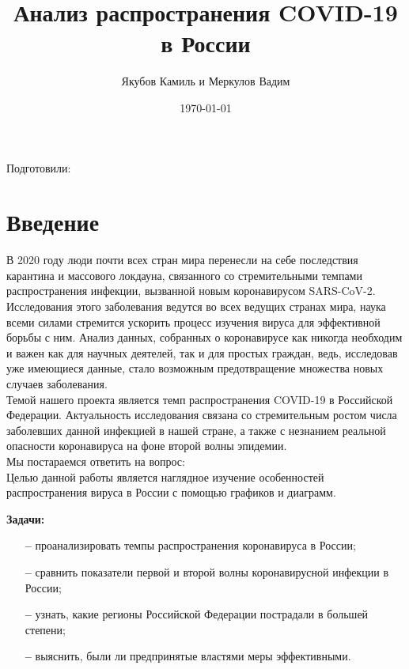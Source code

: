\documentclass[a4paper, 12pt]{extarticle}
\title{Анализ распространения COVID-19 в России}
\author{Якубов Камиль и Меркулов Вадим}
\date{\today}
\begin{document}
\begin{titlepage}
    \vspace*{5cm}
    \begin{center}

        \huge{\textbf{\thetitle}}

        \vspace{2 cm}
        \large
        Подготовили:\\
        \Large{\theauthor}
        \vfill
        \large
        \thedate

    \end{center}
\end{titlepage}

\tableofcontents
\newpage

\section{Введение}

В 2020 году люди почти всех стран мира перенесли на себе последствия карантина
и массового локдауна, связанного со стремительными темпами распространения
инфекции, вызванной новым коронавирусом SARS-CoV-2. Исследования этого
заболевания ведутся во всех ведущих странах мира, наука всеми силами стремится
ускорить процесс изучения вируса для эффективной борьбы с ним. Анализ данных,
собранных о коронавирусе как никогда необходим и важен как для научных
деятелей, так и для простых граждан, ведь, исследовав уже имеющиеся данные,
стало возможным предотвращение множества новых случаев заболевания.
\\

Темой нашего проекта является темп распространения COVID-19 в Российской Федерации. Актуальность исследования связана со стремительным ростом числа заболевших данной инфекцией в нашей стране, а также с незнанием реальной опасности коронавируса на фоне второй волны эпидемии.
\\

Мы постараемся ответить на вопрос: 
\\

 Целью данной работы является наглядное изучение особенностей распространения вируса в России с помощью графиков и диаграмм.
\\

\begin{normalsize}
    \textbf{Задачи:}
\end{normalsize}
\begin{itemize}
    \item[\bfseries--] проанализировать темпы распространения коронавируса в России;
    \item[\bfseries--] сравнить показатели первой и второй волны коронавирусной инфекции в России;
    \item[\bfseries--] узнать, какие регионы Российской Федерации пострадали в большей степени;
    \item[\bfseries--] выяснить, были ли предпринятые властями меры эффективными.
\end{itemize}
\end{document}
